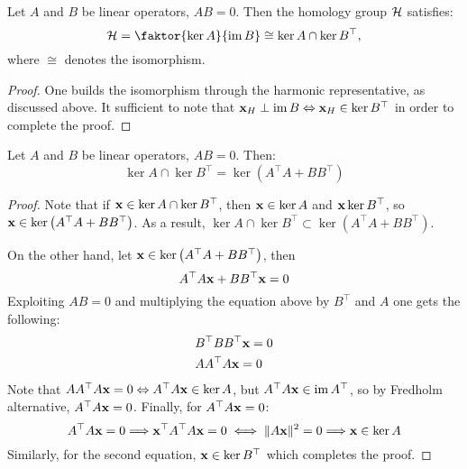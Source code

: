 \begin{theorem}\label{thm:two_kernels}
      Let \( A \) and \( B \) be linear operators, \( A B = 0 \). Then the homology group \( \mathcal{H} \) satisfies:
      \begin{equation}
            \mc H = \faktor{\ker A }{\im B } \cong \ker A \cap \ker B^\top,
      \end{equation}
      where \( \cong \) denotes the isomorphism.
\end{theorem}

\begin{proof}
      One builds the isomorphism through the harmonic representative, as discussed above. It sufficient to note that \( \mathbf{x}_H \perp \operatorname{im} B \Leftrightarrow \mathbf{x}_H \in \ker B^\top \) in order to complete the proof.
\end{proof}

\begin{lemma}\label{lemma:hodge_kernels}
      Let \( A \) and \( B \) be linear operators, \( A B = 0 \). Then:
      \begin{equation}
            \ker A \cap \ker B^\top = \ker \left( A^\top A + B B^\top \right)
      \end{equation}
      \vspace{-\baselineskip}
\end{lemma}

\begin{proof}
      Note that if \( \mathbf{x} \in \ker A \cap \ker B^\top \), then \( \mathbf{x} \in \ker A \) and \( \mathbf{x} \ker B^\top \), so \( \mathbf{x} \in \ker \left( A^\top A + B B^\top  \right)\). As a result, \( \ker A \cap \ker B^\top \subset \ker \left( A^\top A + B B^\top  \right)\).

      On the other hand, let \( \mathbf{x} \in \ker \left( A^\top A + B B^\top \right)\), then
      \begin{equation}
            A^\top A \mathbf{x}  + B B^\top \mathbf{x} = 0
      \end{equation}
      Exploiting \( A B = 0 \) and multiplying the equation above by \( B^\top \) and \( A \) one gets the following:
      \begin{equation}
            \begin{aligned}
                  & B^\top B B^\top \mathbf{x} = 0 \\
                  & A A^\top A \mathbf{x} = 0 
            \end{aligned}
      \end{equation}
      Note that \( A A^\top A \mathbf{x} = 0 \Leftrightarrow A^\top A \mathbf{x} \in \ker A \), but \( A^\top A \mathbf{x} \in \operatorname{im} A^\top \), so by Fredholm alternative, \( A^\top A \mathbf{x} = 0\). Finally, for \( A^\top A \mathbf{x} = 0\):
      \begin{equation}
             A^\top A \mathbf{x} = 0  \Longrightarrow  \mathbf{x}^\top A^\top A \mathbf{x} = 0 \iff \| A \mathbf{x} \|^2 = 0 \Longrightarrow \mathbf{x} \in \ker A  
      \end{equation}
      Similarly, for the second equation, \( \mathbf{x} \in \ker B^\top \) which completes the proof.
\end{proof}

